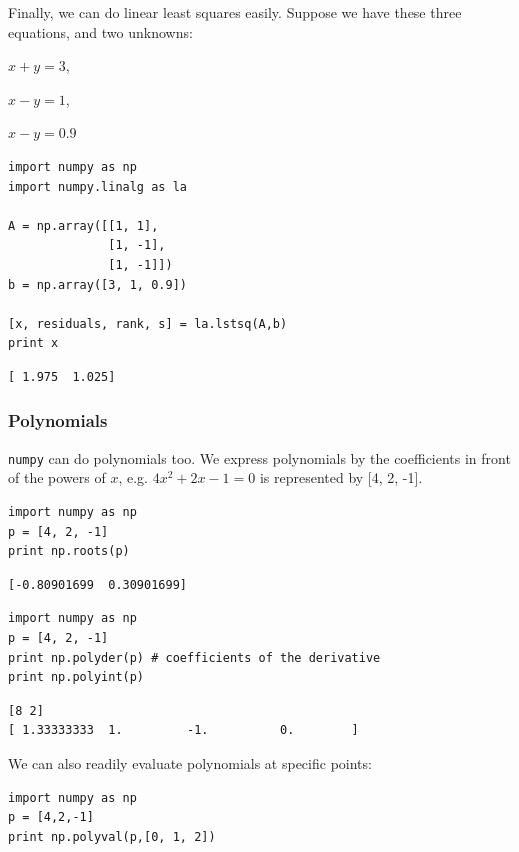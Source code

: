 \documentclass[11pt]{article}
\begin{document}
Finally, we can do linear least squares easily. Suppose we have these three equations, and two unknowns:

$x + y = 3$,

$x - y = 1$,

$x - y = 0.9$

\begin{verbatim}
import numpy as np
import numpy.linalg as la

A = np.array([[1, 1],
              [1, -1],
              [1, -1]])
b = np.array([3, 1, 0.9])

[x, residuals, rank, s] = la.lstsq(A,b)
print x
\end{verbatim}

\begin{verbatim}
[ 1.975  1.025]
\end{verbatim}


\subsubsection{Polynomials}
\label{sec-3-11-3}
\texttt{numpy} can do polynomials too. We express polynomials by the coefficients in front of the powers of $x$, e.g. $4 x^2 + 2x - 1 = 0$ is represented by [4, 2, -1].

\begin{verbatim}
import numpy as np
p = [4, 2, -1]
print np.roots(p)
\end{verbatim}

\begin{verbatim}
[-0.80901699  0.30901699]
\end{verbatim}

\begin{verbatim}
import numpy as np
p = [4, 2, -1]
print np.polyder(p) # coefficients of the derivative
print np.polyint(p)
\end{verbatim}

\begin{verbatim}
[8 2]
[ 1.33333333  1.         -1.          0.        ]
\end{verbatim}

We can also readily evaluate polynomials at specific points:
\begin{verbatim}
import numpy as np
p = [4,2,-1]
print np.polyval(p,[0, 1, 2])
\end{verbatim}
\end{document}
